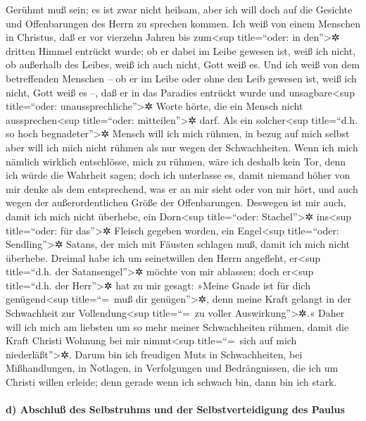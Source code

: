  Gerühmt muß sein; es ist zwar nicht heilsam, aber ich
will doch auf die Gesichte und Offenbarungen des Herrn zu sprechen
kommen.  Ich weiß von einem Menschen in Christus, daß er
vor vierzehn Jahren bis zum\textless sup title=``oder: in
den''\textgreater✲ dritten Himmel entrückt wurde; ob er dabei im Leibe
gewesen ist, weiß ich nicht, ob außerhalb des Leibes, weiß ich auch
nicht, Gott weiß es.  Und ich weiß von dem betreffenden
Menschen -- ob er im Leibe oder ohne den Leib gewesen ist, weiß ich
nicht, Gott weiß es --,  daß er in das Paradies entrückt
wurde und unsagbare\textless sup title=``oder:
unaussprechliche''\textgreater✲ Worte hörte, die ein Mensch nicht
aussprechen\textless sup title=``oder: mitteilen''\textgreater✲ darf.
 Als ein solcher\textless sup title=``d.h. so hoch
begnadeter''\textgreater✲ Mensch will ich mich rühmen, in bezug auf mich
selbst aber will ich mich nicht rühmen als nur wegen der Schwachheiten.
 Wenn ich mich nämlich wirklich entschlösse, mich zu
rühmen, wäre ich deshalb kein Tor, denn ich würde die Wahrheit sagen;
doch ich unterlasse es, damit niemand höher von mir denke als dem
entsprechend, was er an mir sieht oder von mir hört,  und
auch wegen der außerordentlichen Größe der Offenbarungen. Deswegen ist
mir auch, damit ich mich nicht überhebe, ein Dorn\textless sup
title=``oder: Stachel''\textgreater✲ ins\textless sup title=``oder: für
das''\textgreater✲ Fleisch gegeben worden, ein Engel\textless sup
title=``oder: Sendling''\textgreater✲ Satans, der mich mit Fäusten
schlagen muß, damit ich mich nicht überhebe.  Dreimal habe
ich um seinetwillen den Herrn angefleht, er\textless sup title=``d.h.
der Satansengel''\textgreater✲ möchte von mir ablassen; 
doch er\textless sup title=``d.h. der Herr''\textgreater✲ hat zu mir
gesagt: »Meine Gnade ist für dich genügend\textless sup title=``=~muß
dir genügen''\textgreater✲, denn meine Kraft gelangt in der Schwachheit
zur Vollendung\textless sup title=``=~zu voller
Auswirkung''\textgreater✲.« Daher will ich mich am liebsten um so mehr
meiner Schwachheiten rühmen, damit die Kraft Christi Wohnung bei mir
nimmt\textless sup title=``=~sich auf mich niederläßt''\textgreater✲.
 Darum bin ich freudigen Muts in Schwachheiten, bei
Mißhandlungen, in Notlagen, in Verfolgungen und Bedrängnissen, die ich
um Christi willen erleide; denn gerade wenn ich schwach bin, dann bin
ich stark.

\hypertarget{d-abschluuxdf-des-selbstruhms-und-der-selbstverteidigung-des-paulus}{%
\paragraph{d) Abschluß des Selbstruhms und der Selbstverteidigung des
Paulus}\label{d-abschluuxdf-des-selbstruhms-und-der-selbstverteidigung-des-paulus}}

